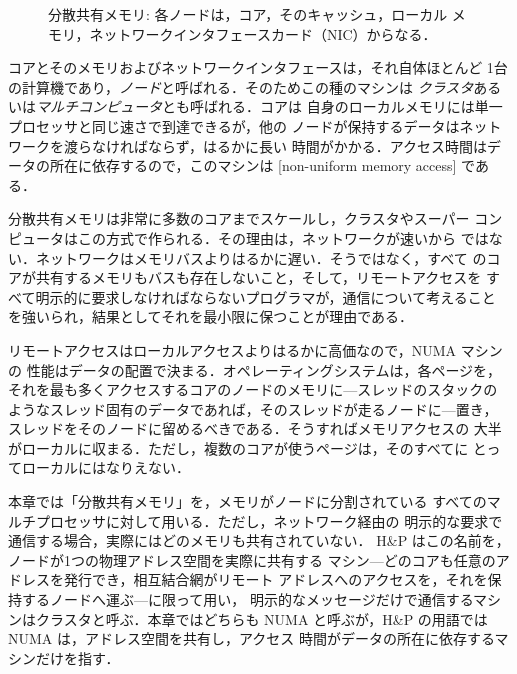 \documentclass[../main.tex]{subfiles}
\begin{document}
\begin{figure}[htbp]
  \centering
  
  \caption{分散共有メモリ: 各ノードは，コア，そのキャッシュ，ローカル
    メモリ，ネットワークインタフェースカード（NIC）からなる．}
  \label{fig:l18-distributed}
\end{figure}

コアとそのメモリおよびネットワークインタフェースは，それ自体ほとんど
1台の計算機であり，\emph{ノード}と呼ばれる．そのためこの種のマシンは
\emph{クラスタ}あるいは\emph{マルチコンピュータ}とも呼ばれる．コアは
自身のローカルメモリには単一プロセッサと同じ速さで到達できるが，他の
ノードが保持するデータはネットワークを渡らなければならず，はるかに長い
時間がかかる．アクセス時間はデータの所在に依存するので，このマシンは
[non-uniform memory access] である．

分散共有メモリは非常に多数のコアまでスケールし，クラスタやスーパー
コンピュータはこの方式で作られる．その理由は，ネットワークが速いから
ではない．ネットワークはメモリバスよりはるかに遅い．そうではなく，すべて
のコアが共有するメモリもバスも存在しないこと，そして，リモートアクセスを
すべて明示的に要求しなければならないプログラマが，通信について考えること
を強いられ，結果としてそれを最小限に保つことが理由である．

リモートアクセスはローカルアクセスよりはるかに高価なので，NUMA マシンの
性能はデータの配置で決まる．オペレーティングシステムは，各ページを，
それを最も多くアクセスするコアのノードのメモリに---スレッドのスタックの
ようなスレッド固有のデータであれば，そのスレッドが走るノードに---置き，
スレッドをそのノードに留めるべきである．そうすればメモリアクセスの
大半がローカルに収まる．ただし，複数のコアが使うページは，そのすべてに
とってローカルにはなりえない．

\begin{note}[用語について]
  本章では「分散共有メモリ」を，メモリがノードに分割されている
  すべてのマルチプロセッサに対して用いる．ただし，ネットワーク経由の
  明示的な要求で通信する場合，実際にはどのメモリも共有されていない．
  H\&P はこの名前を，ノードが1つの物理アドレス空間を実際に共有する
  マシン---どのコアも任意のアドレスを発行でき，相互結合網がリモート
  アドレスへのアクセスを，それを保持するノードへ運ぶ---に限って用い，
  明示的なメッセージだけで通信するマシンはクラスタと呼ぶ．本章ではどちらも
  NUMA と呼ぶが，H\&P の用語では NUMA は，アドレス空間を共有し，アクセス
  時間がデータの所在に依存するマシンだけを指す．
\end{note}
\end{document}
